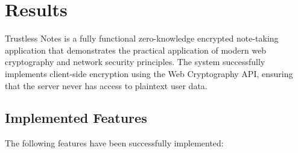 
\chapter{Results}

Trustless Notes is a fully functional zero-knowledge encrypted note-taking application that demonstrates the practical application of modern web cryptography and network security principles. The system successfully implements client-side encryption using the Web Cryptography API, ensuring that the server never has access to plaintext user data.

\section{Implemented Features}

The following features have been successfully implemented:

